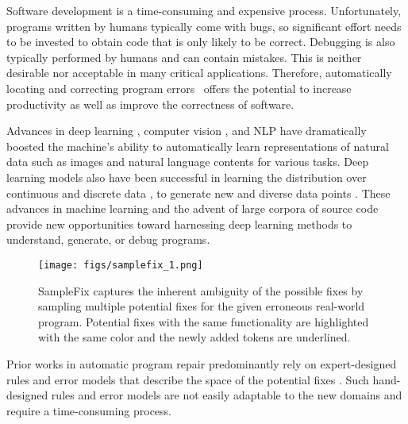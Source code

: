 \documentclass[runningheads]{llncs}
\begin{document}
Software development is a time-consuming and expensive process. Unfortunately, programs written by humans typically come with bugs, so significant effort needs to be invested to obtain code that is only likely to be correct. Debugging is also typically performed by humans and 
can contain mistakes. This is neither desirable nor acceptable in many critical applications. Therefore, automatically locating and correcting program errors~\cite{GouesPR19} offers the potential to increase productivity as well as improve the correctness of software. 


Advances in deep learning \cite{alexnet,ng11unsupervised}, computer vision \cite{Girshick15fast,Simonyan15}, and NLP \cite{sutskever14seq2seq,Bahdanau2015NeuralMT} have dramatically boosted the machine's ability to automatically learn representations of natural data such as images and natural language contents for various tasks.  Deep learning models also have been successful in learning the distribution over continuous \cite{cvae15sohn,autoencodr14kingma} and discrete data \cite{Maddison2017TheCD,jang18gumbel}, to generate new and diverse data points \cite{three_pillars}. These advances in machine learning and the advent of large corpora of source code~\cite{bigcode} provide new opportunities toward harnessing deep learning methods to understand, generate, or debug programs.


\begin{figure*}[h] 
	\centering
	    \centering
		\texttt{[image: figs/samplefix\_1.png]}
	
	\caption{SampleFix captures the inherent ambiguity of the possible fixes by sampling multiple potential fixes for the given erroneous real-world program. Potential fixes with the same functionality are highlighted with the same color and the newly added tokens are underlined.}
	\label{fig:teaser}
	\vspace{-0.5cm}
\end{figure*}

\iffalse
\begin{figure}
\centering
    \texttt{[image: figs/teaser\_prog56026\_fixes5.png]}
    \caption{SampleFix captures the inherent ambiguity of the possible fixes by sampling multiple potential fixes for the given erroneous real-world program. Potential fixes with the same functionality are highlighted with the same color.}
\label{fig:teaser}
\end{figure}
\fi

Prior works in automatic program repair predominantly rely on expert-designed rules and error models that describe the space of the potential fixes  \cite{singh2013automated,d2016qlose}. Such hand-designed rules and error models are not easily adaptable to the new domains and require a time-consuming process.
\end{document}
